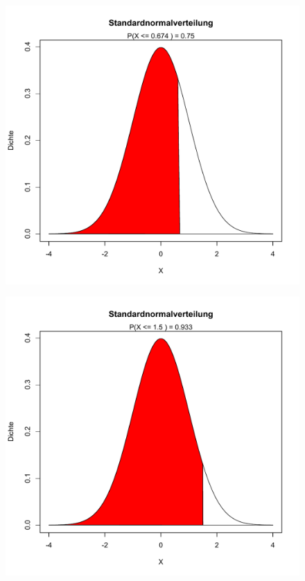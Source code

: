 \documentclass{beamer}
\begin{document}
\begin{frame}{\insertsection}
	\begin{figure}[htbp]
		\centering
		\includegraphics[height=0.99\textheight]{figures/standardnorm_quantil}
	\end{figure}
\end{frame}
\begin{frame}{\insertsection}
	\begin{figure}[htbp]
		\centering
		\includegraphics[height=0.99\textheight]{figures/standardnorm}
	\end{figure}
\end{frame}
\end{document}
